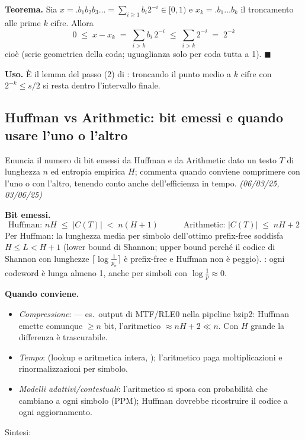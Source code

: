 \textbf{Teorema.} Sia $x=.b_1b_2b_3\ldots=\sum_{i\ge1}b_i2^{-i}\in[0,1)$ e $x_k=.b_1\ldots b_k$ il
troncamento alle prime $k$ cifre. Allora
\[
\boxed{\ 0\;\le\;x-x_k\;=\;\sum_{i>k}b_i\,2^{-i}\;\le\;\sum_{i>k}2^{-i}\;=\;2^{-k}\ }
\]
cio\`e  (serie geometrica
della coda; uguaglianza solo per coda tutta a 1). $\blacksquare$

\textbf{Uso.} \`E il lemma del passo (2) di : troncando il punto medio a $k$ cifre con
$2^{-k}\le s/2$ si resta dentro l'intervallo finale.

\subsection*{ Huffman vs Arithmetic: bit emessi e quando usare l'uno o l'altro}

\begin{domanda}
Enuncia il numero di bit emessi da Huffman e da Arithmetic dato un testo $T$ di lunghezza $n$ ed
entropia empirica $H$; commenta quando conviene comprimere con l'uno o con l'altro, tenendo conto
anche dell'efficienza in tempo. \emph{(06/03/25, 03/06/25)}
\end{domanda}

\textbf{Bit emessi.}
\[
\boxed{\ \text{Huffman: } nH\;\le\;|C(T)|\;<\;n(H+1)
\qquad\quad
\text{Arithmetic: } |C(T)|\;\le\;nH+2\ }
\]
Per Huffman: la lunghezza media per simbolo dell'ottimo prefix-free soddisfa $H\le L<H+1$ (lower
bound di Shannon; upper bound perch\'e il codice di Shannon con lunghezze
$\lceil\log\frac1{p_\sigma}\rceil$ \`e prefix-free e Huffman non \`e peggio). : ogni codeword \`e lunga almeno 1, anche per simboli
con $\log\frac1p\approx0$.

\textbf{Quando conviene.}
\begin{itemize}[leftmargin=1.6em,itemsep=1pt]
\item \emph{Compressione}:  ---
es.\ output di MTF/RLE0 nella pipeline bzip2: Huffman emette comunque $\ge n$ bit, l'aritmetico
$\approx nH+2\ll n$. Con $H$ grande la differenza \`e trascurabile.
\item \emph{Tempo}:  (lookup e aritmetica intera,
); l'aritmetico paga moltiplicazioni e rinormalizzazioni per simbolo.
\item \emph{Modelli adattivi/contestuali}: l'aritmetico si sposa con probabilit\`a che cambiano a
ogni simbolo (PPM); Huffman dovrebbe ricostruire il codice a ogni aggiornamento.
\end{itemize}
Sintesi: 

